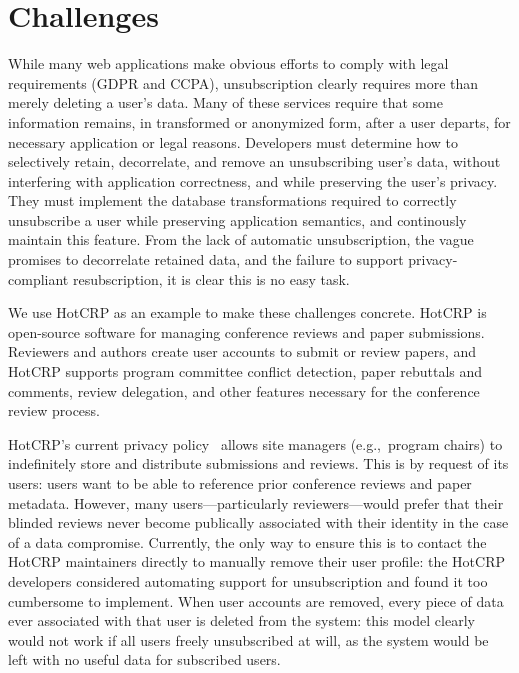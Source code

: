 \section{Challenges}
While many web applications make obvious efforts to comply with legal requirements (GDPR and CCPA),
unsubscription clearly requires more than merely deleting a user's data. Many of these services
require that some information remains, in transformed or anonymized form, after a user departs, for
necessary application or legal reasons. 
%
Developers must determine how to selectively retain, decorrelate, and remove an unsubscribing user's data,
without interfering with application correctness, and while preserving the user's privacy. They must 
implement the database transformations required to correctly unsubscribe a user while
preserving application semantics, and continously maintain this feature. 
%
From the lack of automatic unsubscription, the vague promises to decorrelate retained data, and the
failure to support privacy-compliant resubscription, it is clear this is no easy task.
%

We use HotCRP as an example to make these challenges concrete. HotCRP is open-source software for
managing conference reviews and paper submissions.  Reviewers and authors create user accounts to
submit or review papers, and HotCRP supports program committee conflict detection, paper rebuttals
and comments, review delegation, and other features necessary for the conference review process.

HotCRP's current privacy policy~\cite{hotcrp:privacy} allows site managers (e.g.,\ program chairs)
to indefinitely store and distribute submissions and reviews.  This is by request of its users:
users want to be able to reference prior conference reviews and paper metadata.  However, many
users---particularly reviewers---would prefer that their blinded reviews never become publically
associated with their identity in the case of a data compromise. Currently, the only way to ensure
this is to contact the HotCRP maintainers directly to manually remove their user profile: the HotCRP
developers considered automating support for unsubscription and found it too cumbersome to
implement. 
%
%
When user accounts are removed, every piece of data ever associated with that
user is deleted from the system: this model clearly would not work if all users freely
unsubscribed at will, as the system would be left with no useful data for subscribed users.


